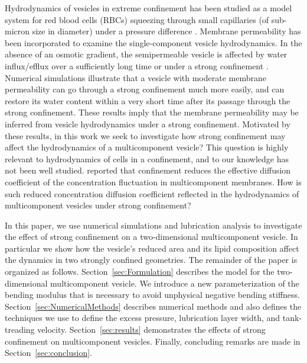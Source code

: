 \documentclass[twoside,twocolumn,9pt]{article}
\begin{document}
Hydrodynamics of vesicles in extreme confinement has been studied as a
model system for red blood cells (RBCs) squeezing through small
capillaries (of sub-micron size in diameter) under a pressure difference
\cite{Freund2013_PoF, LuPeng2019_PoF, che-lyu-jae-leo2020,
gur-pak-tay-siv-sac2023}. Membrane permeability has been incorporated to
examine the single-component vesicle hydrodynamics. In the absence of an
osmotic gradient, the semipermeable vesicle is affected by water
influx/efflux over a sufficiently long time or under a strong
confinement \cite{qua-gan-you2021}. Numerical simulations illustrate
that a vesicle with moderate membrane permeability can go through a
strong confinement much more easily, and can restore its water content
within a very short time after its passage through the strong
confinement. These results imply that the membrane permeability may be
inferred from vesicle hydrodynamics under a strong confinement.
Motivated by these results, in this work we seek to investigate how
strong confinement may affect the hydrodynamics of a multicomponent
vesicle? This question is highly relevant to hydrodynamics of cells in a
confinement, and to our knowledge has not been well studied.
\citet{ram-kom-sek-ima2010} reported that confinement reduces the
effective diffusion coefficient of the concentration fluctuation in
multicomponent membranes. How is such reduced concentration diffusion
coefficient reflected in the hydrodynamics of multicomponent vesicles
under strong confinement?


In this paper, we use numerical simulations and lubrication analysis
\cite{mis-wis-ber-key-li-tun-law-per-erd-zha-zha-sun-kal-lam-kon2019} to
investigate the effect of strong confinement on a two-dimensional
multicomponent vesicle.  In particular we show how the vesicle's reduced
area and its lipid composition affect the dynamics in two strongly
confined geometries.
%
The remainder of the paper is organized as follows.
Section~\ref{sec:Formulation} describes the model for the
two-dimensional multicomponent vesicle. We introduce a new
parameterization of the bending modulus that is necessary to avoid
unphysical negative bending stiffness.
Section~\ref{sec:NumericalMethods} describes numerical methods and also
defines the techniques we use to define the excess pressure, lubrication
layer width, and tank-treading velocity. Section~\ref{sec:results}
demonstrates the effects of strong confinement on multicomponent
vesicles. Finally, concluding remarks are made in
Section~\ref{sec:conclusion}.
\end{document}
